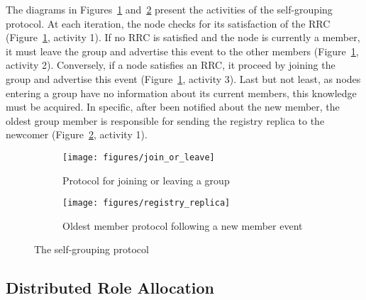 The diagrams in Figures~\ref{fig:join_or_leave} and~\ref{fig:registry_replica} present the activities of the self-grouping protocol. At each iteration, the node checks for its satisfaction of the RRC (Figure~\ref{fig:join_or_leave}, activity 1). If no RRC is satisfied and the node is currently a member, it must leave the group and advertise this event to the other members (Figure~\ref{fig:join_or_leave}, activity 2). Conversely, if a node satisfies an RRC, it proceed by joining the group and advertise this event (Figure~\ref{fig:join_or_leave}, activity 3). Last but not least, as nodes entering a group have no information about its current members, this knowledge must be acquired. In specific, after been notified about the new member, the oldest group member is responsible for sending the registry replica to the newcomer (Figure~\ref{fig:registry_replica}, activity 1).


\begin{figure}[t!]
	\centering
	\begin{subfigure}[b]{0.45\textwidth}
		\centering
		\texttt{[image: figures/join\_or\_leave]}
		\caption{Protocol for joining or leaving a group}
		\label{fig:join_or_leave}
	\end{subfigure}%
	
	\begin{subfigure}[b]{0.45\textwidth}
		\centering
		\texttt{[image: figures/registry\_replica]}
		\caption{Oldest member protocol following a new member event}
		\label{fig:registry_replica}
	\end{subfigure}
	\caption{The self-grouping protocol}
	\label{fig:self_grouping}
\end{figure}




 
\subsection{Distributed Role Allocation} 



